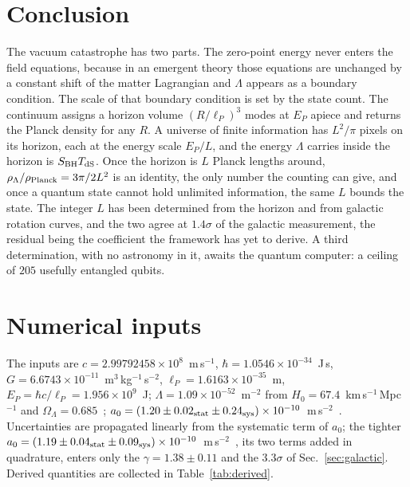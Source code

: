 \documentclass[aps,prd,twocolumn,superscriptaddress,nofootinbib,showkeys]{revtex4-2}
\begin{document}
\section{Conclusion}

The vacuum catastrophe has two parts. The zero-point energy never enters the field equations, because in an emergent theory those equations are unchanged by a constant shift of the matter Lagrangian and $\Lambda$ appears as a boundary condition. The scale of that boundary condition is set by the state count. The continuum assigns a horizon volume $(R/\ell_P)^3$ modes at $E_P$ apiece and returns the Planck density for any $R$. A universe of finite information has $L^2/\pi$ pixels on its horizon, each at the energy scale $E_P/L$, and the energy $\Lambda$ carries inside the horizon is $S_{\rm BH}T_{\rm dS}$. Once the horizon is $L$ Planck lengths around, $\rho_\Lambda/\rho_{\rm Planck}=3\pi/2L^2$ is an identity, the only number the counting can give, and once a quantum state cannot hold unlimited information, the same $L$ bounds the state. The integer $L$ has been determined from the horizon and from galactic rotation curves, and the two agree at $1.4\sigma$ of the galactic measurement, the residual being the coefficient the framework has yet to derive. A third determination, with no astronomy in it, awaits the quantum computer: a ceiling of $205$ usefully entangled qubits.

\appendix

\section{Numerical inputs}
\label{app:numbers}

The inputs are $c=2.99792458\times10^8$~m\,s$^{-1}$, $\hbar=1.0546\times10^{-34}$~J\,s, $G=6.6743\times10^{-11}$~m$^3$\,kg$^{-1}$\,s$^{-2}$, $\ell_P=1.6163\times10^{-35}$~m, $E_P = \hbar c/\ell_P = 1.956\times10^{9}$~J; $\Lambda=1.09\times10^{-52}$~m$^{-2}$ from $H_0=67.4$~km\,s$^{-1}$\,Mpc$^{-1}$ and $\Omega_\Lambda=0.685$~\cite{planck2018}; $a_0=(1.20\pm0.02_{\rm stat}\pm0.24_{\rm sys})\times10^{-10}$~m\,s$^{-2}$~\cite{mcgaugh2016}. Uncertainties are propagated linearly from the systematic term of $a_0$; the tighter $a_0=(1.19\pm0.04_{\rm stat}\pm0.09_{\rm sys})\times10^{-10}$~m\,s$^{-2}$~\cite{desmond2023}, its two terms added in quadrature, enters only the $\gamma = 1.38\pm0.11$ and the $3.3\sigma$ of Sec.~\ref{sec:galactic}. Derived quantities are collected in Table~\ref{tab:derived}.
\end{document}
